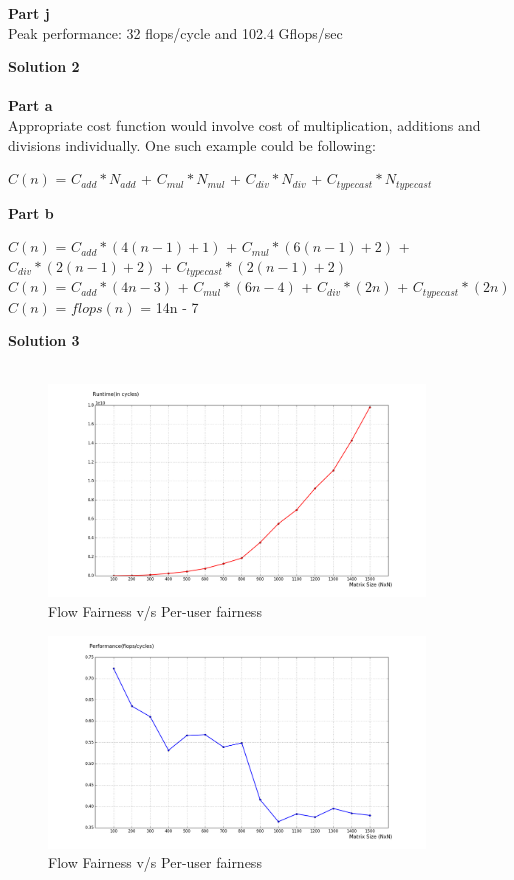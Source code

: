 \documentclass[letterpaper, 11pt]{article}
\begin{document}
\textbf{Part j} \\
Peak performance: 32 flops/cycle and 102.4 Gflops/sec
\bigskip

\textbf{Solution 2}\\ \\
\textbf{Part a} \\
Appropriate cost function would involve cost of multiplication, additions and divisions individually. One such example could be following:
\begin{center}
$C(n)$ = $C_{add} * N_{add}$ + $C_{mul} * N_{mul}$ + $C_{div} * N_{div}$ + $C_{typecast} * N_{typecast}$
\end{center}
\textbf{Part b}
\begin{center}
$C(n)$ = $C_{add}*(4(n-1)+1)$ + $C_{mul}*(6(n-1)+2)$ + $C_{div}*(2(n-1)+2)$ +  $C_{typecast}*(2(n-1)+2)$ \\
$C(n)$ = $C_{add}*(4n-3)$ + $C_{mul}*(6n-4)$ + $C_{div}*(2n)$ +  $C_{typecast}*(2n)$ \\
$C(n)$ = $flops(n)$ = 14n - 7
\end{center}

\textbf{Solution 3}\\ \\
\begin{figure}[h!]
    \centering
    \includegraphics[width=100mm]{sol_3_1}
    \caption{Flow Fairness v/s Per-user fairness}
\end{figure}

\begin{figure}[h!]
    \centering
    \includegraphics[width=100mm]{sol_3_2}
    \caption{Flow Fairness v/s Per-user fairness}
\end{figure}
\end{document}
